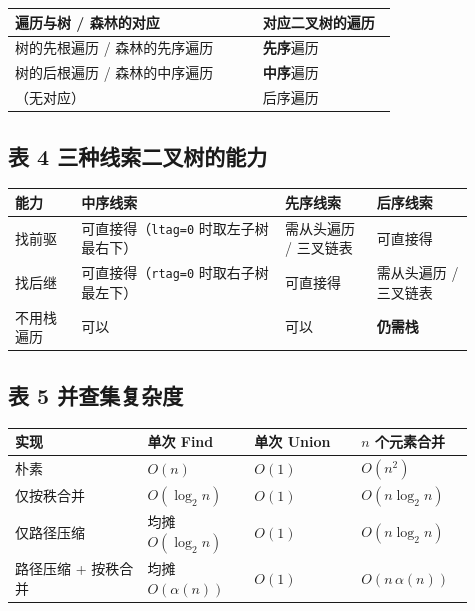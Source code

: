 \documentclass[11pt,openany,UTF8]{ctexbook}
\begin{document}
\begingroup\small\setlength{\tabcolsep}{4.0pt}
\begin{longtable}{@{}L{0.6108\linewidth}L{0.3349\linewidth}@{}}
\toprule
\textbf{遍历与树 / 森林的对应} & \textbf{对应二叉树的遍历} \\
\midrule
\endhead
树的先根遍历 / 森林的先序遍历 & \textbf{先序}遍历 \\
树的后根遍历 / 森林的中序遍历 & \textbf{中序}遍历 \\
（无对应） & 后序遍历 \\
\bottomrule
\end{longtable}
\endgroup

\subsection{表 4 三种线索二叉树的能力}

\begingroup\small\setlength{\tabcolsep}{4.0pt}
\begin{longtable}{@{}L{0.1338\linewidth}L{0.4013\linewidth}L{0.1839\linewidth}L{0.1923\linewidth}@{}}
\toprule
\textbf{能力} & \textbf{中序线索} & \textbf{先序线索} & \textbf{后序线索} \\
\midrule
\endhead
找前驱 & 可直接得（\texttt{ltag=\allowbreak{}0} 时取左子树最右下） & 需从头遍历 / 三叉链表 & 可直接得 \\
找后继 & 可直接得（\texttt{rtag=\allowbreak{}0} 时取右子树最左下） & 可直接得 & 需从头遍历 / 三叉链表 \\
不用栈遍历 & 可以 & 可以 & \textbf{仍需栈} \\
\bottomrule
\end{longtable}
\endgroup

\subsection{表 5 并查集复杂度}

\begingroup\small\setlength{\tabcolsep}{4.0pt}
\begin{longtable}{@{}L{0.2680\linewidth}L{0.2144\linewidth}L{0.2144\linewidth}L{0.2144\linewidth}@{}}
\toprule
\textbf{实现} & \textbf{单次 Find} & \textbf{单次 Union} & \textbf{$n$ 个元素合并} \\
\midrule
\endhead
朴素 & $O(n)$ & $O(1)$ & $O(n^2)$ \\
仅按秩合并 & $O(\log_2 n)$ & $O(1)$ & $O(n\log_2 n)$ \\
仅路径压缩 & 均摊 $O(\log_2 n)$ & $O(1)$ & $O(n\log_2 n)$ \\
路径压缩 + 按秩合并 & 均摊 $O(\alpha(n))$ & $O(1)$ & $O(n\,\alpha(n))$ \\
\bottomrule
\end{longtable}
\endgroup
\end{document}
